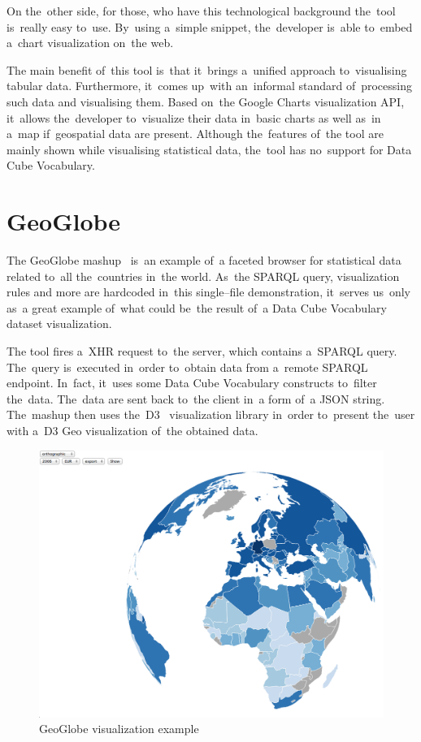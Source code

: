 On the~other side, for those, who have this technological background the~tool is~really easy to~use. By~using a~simple snippet, the~developer is~able to~embed a~chart visualization on~the web.

The main benefit of~this tool is~that it~brings a~unified approach to~visualising tabular data. Furthermore, it~comes up~with an~informal standard of~processing such data and visualising them. Based on~the Google Charts visualization 
API, it~allows the~developer to~visualize their data in~basic charts 
as well as~in a~map if~geospatial data are present. Although the~features of~the 
tool are mainly shown while visualising statistical data, the~tool has no~support for 
Data Cube Vocabulary.

\section{GeoGlobe}
The GeoGlobe mashup~\cite{geoglobe} is~an example of~a faceted browser for 
statistical data related to~all the~countries in~the world. As~the SPARQL 
query, visualization rules and more are hardcoded in~this single--file 
demonstration, it~serves us~only as~a great example of~what could be~the result of~a
Data Cube Vocabulary dataset visualization.

The tool fires a~XHR request to~the server, which contains a~SPARQL query. The~query is~executed in~order to~obtain data from a~remote SPARQL endpoint. In~fact, it~uses some Data Cube Vocabulary constructs to~filter the~data. The~data 
are sent back to~the client in~a form of~a JSON string. The~mashup then uses the~D3~\cite{d3} visualization library in~order to~present the~user with a~D3 Geo 
visualization of~the obtained data.

\begin{figure}
	\centering
	\includegraphics[width=140mm]{img/geoglobe.png}
	\caption{GeoGlobe visualization example}
	\label{fig:geoglobe}
\end{figure}


